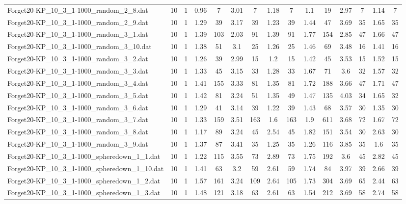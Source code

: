 \begin{table}[!ht]
{\begin{tabular}{lcccccccccccccc}
Forget20-KP\_10\_3\_1-1000\_random\_2\_8.dat & 10 & 1 & 0.96 & 7 & 3.01 & 7 & 1.18 & 7 & 1.1 & 19 & 2.97 & 7 & 1.14 & 7 \\
Forget20-KP\_10\_3\_1-1000\_random\_2\_9.dat & 10 & 1 & 1.29 & 39 & 3.17 & 39 & 1.23 & 39 & 1.44 & 47 & 3.69 & 35 & 1.65 & 35 \\
Forget20-KP\_10\_3\_1-1000\_random\_3\_1.dat & 10 & 1 & 1.39 & 103 & 2.03 & 91 & 1.39 & 91 & 1.77 & 154 & 2.85 & 47 & 1.66 & 47 \\
Forget20-KP\_10\_3\_1-1000\_random\_3\_10.dat & 10 & 1 & 1.38 & 51 & 3.1 & 25 & 1.26 & 25 & 1.46 & 69 & 3.48 & 16 & 1.41 & 16 \\
Forget20-KP\_10\_3\_1-1000\_random\_3\_2.dat & 10 & 1 & 1.26 & 39 & 2.99 & 15 & 1.2 & 15 & 1.42 & 45 & 3.53 & 15 & 1.52 & 15 \\
Forget20-KP\_10\_3\_1-1000\_random\_3\_3.dat & 10 & 1 & 1.33 & 45 & 3.15 & 33 & 1.28 & 33 & 1.67 & 71 & 3.6 & 32 & 1.57 & 32 \\
Forget20-KP\_10\_3\_1-1000\_random\_3\_4.dat & 10 & 1 & 1.41 & 155 & 3.33 & 81 & 1.35 & 81 & 1.72 & 188 & 3.66 & 47 & 1.71 & 47 \\
Forget20-KP\_10\_3\_1-1000\_random\_3\_5.dat & 10 & 1 & 1.42 & 81 & 3.24 & 51 & 1.35 & 49 & 1.47 & 135 & 4.03 & 34 & 1.65 & 32 \\
Forget20-KP\_10\_3\_1-1000\_random\_3\_6.dat & 10 & 1 & 1.29 & 41 & 3.14 & 39 & 1.22 & 39 & 1.43 & 68 & 3.57 & 30 & 1.35 & 30 \\
Forget20-KP\_10\_3\_1-1000\_random\_3\_7.dat & 10 & 1 & 1.33 & 159 & 3.51 & 163 & 1.6 & 163 & 1.9 & 611 & 3.68 & 72 & 1.67 & 72 \\
Forget20-KP\_10\_3\_1-1000\_random\_3\_8.dat & 10 & 1 & 1.17 & 89 & 3.24 & 45 & 2.54 & 45 & 1.82 & 151 & 3.54 & 30 & 2.63 & 30 \\
Forget20-KP\_10\_3\_1-1000\_random\_3\_9.dat & 10 & 1 & 1.37 & 87 & 3.41 & 35 & 1.25 & 35 & 1.26 & 116 & 3.85 & 35 & 1.6 & 35 \\
Forget20-KP\_10\_3\_1-1000\_spheredown\_1\_1.dat & 10 & 1 & 1.22 & 115 & 3.55 & 73 & 2.89 & 73 & 1.75 & 192 & 3.6 & 45 & 2.82 & 45 \\
Forget20-KP\_10\_3\_1-1000\_spheredown\_1\_10.dat & 10 & 1 & 1.41 & 63 & 3.2 & 59 & 2.61 & 59 & 1.74 & 84 & 3.97 & 39 & 2.66 & 39 \\
Forget20-KP\_10\_3\_1-1000\_spheredown\_1\_2.dat & 10 & 1 & 1.57 & 161 & 3.24 & 109 & 2.64 & 105 & 1.73 & 304 & 3.69 & 65 & 2.44 & 63 \\
Forget20-KP\_10\_3\_1-1000\_spheredown\_1\_3.dat & 10 & 1 & 1.48 & 121 & 3.18 & 63 & 2.61 & 63 & 1.54 & 212 & 3.69 & 58 & 2.74 & 58 \\

\end{tabular}}
\end{table}
